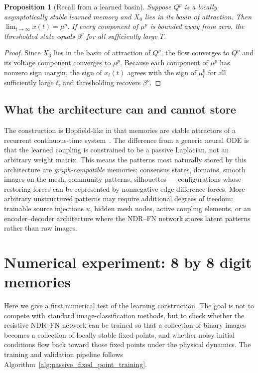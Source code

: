 \documentclass[11pt]{article}
\newtheorem{proposition}{Proposition}
\begin{document}
\begin{proposition}[Recall from a learned basin]
  \label{prop:recall_from_basin}
  Suppose $Q^p$ is a locally asymptotically stable learned memory and
  $X_0$ lies in its basin of attraction. Then
  $\lim_{t\to\infty}x(t)=\mu^p$. If every component of $\mu^p$ is
  bounded away from zero, the thresholded state equals $\beta^p$ for
  all sufficiently large $T$.
\end{proposition}

\begin{proof}
  Since $X_0$ lies in the basin of attraction of $Q^p$, the flow
  converges to $Q^p$ and its voltage component converges to $\mu^p$.
  Because each component of $\mu^p$ has nonzero sign margin, the sign
  of $x_i(t)$ agrees with the sign of $\mu_i^p$ for all sufficiently
  large $t$, and thresholding recovers $\beta^p$.
\end{proof}

\subsection{What the architecture can and cannot store}

The construction is Hopfield-like in that memories are stable attractors
of a recurrent continuous-time system~\cite{hopfield1982}. The
difference from a generic neural ODE is that the learned coupling is
constrained to be a passive Laplacian, not an arbitrary weight matrix.
This means the patterns most naturally stored by this architecture are
\emph{graph-compatible} memories: consensus states, domains, smooth
images on the mesh, community patterns, silhouettes --- configurations
whose restoring forces can be represented by nonnegative edge-difference
forces. More arbitrary unstructured patterns may require additional
degrees of freedom: trainable source injections $u$, hidden mesh nodes,
active coupling elements, or an encoder--decoder architecture where the
NDR--FN network stores latent patterns rather than raw images.


\section{Numerical experiment: 8 by 8 digit memories}
\label{sec:digit_learning_results}

Here we give a first numerical test of the learning construction. The
goal is not to compete with standard image-classification methods, but
to check whether the resistive NDR--FN network can be trained so that a
collection of binary images becomes a collection of locally stable fixed
points, and whether noisy initial conditions flow back toward those
fixed points under the physical dynamics.  The training and validation
pipeline follows Algorithm~\ref{alg:passive_fixed_point_training}.
\end{document}
